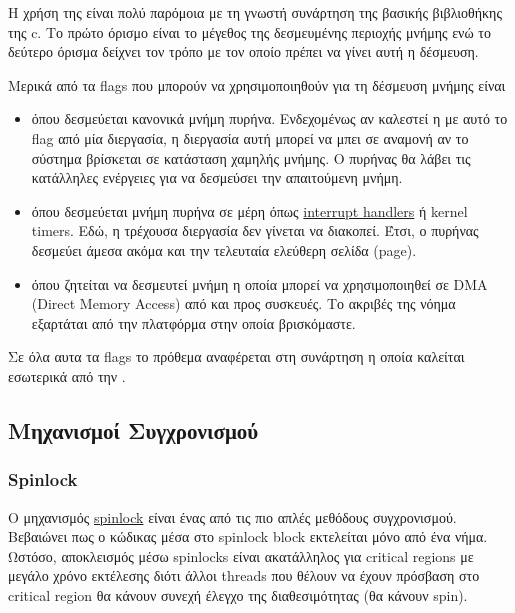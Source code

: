 \documentclass[18pt]{extarticle}
\begin{document}
\begin{file}
    
\end{file}

Η χρήση της είναι πολύ παρόμοια με τη γνωστή συνάρτηση  της βασικής βιβλιοθήκης της c.
Το πρώτο όρισμο είναι το μέγεθος της δεσμευμένης περιοχής μνήμης ενώ το δεύτερο όρισμα δείχνει τον τρόπο με τον οποίο πρέπει να γίνει αυτή η δέσμευση.

Μερικά από τα flags που μπορούν να χρησιμοποιηθούν για τη δέσμευση μνήμης είναι

\begin{itemize}
    \item {} όπου δεσμεύεται κανονικά μνήμη πυρήνα. Ενδεχομένως αν καλεστεί η  με αυτό το flag
        από μία διεργασία, η διεργασία αυτή μπορεί να μπει σε αναμονή αν το σύστημα βρίσκεται σε κατάσταση χαμηλής μνήμης.
        Ο πυρήνας θα λάβει τις κατάλληλες ενέργειες για να δεσμεύσει την απαιτούμενη μνήμη. 
    \item {} όπου δεσμεύεται μνήμη πυρήνα σε μέρη όπως \href{https://en.wikipedia.org/wiki/Interrupt_handler}{interrupt handlers}
            ή kernel timers. Εδώ, η τρέχουσα διεργασία δεν γίνεται να διακοπεί.
            Έτσι, ο πυρήνας δεσμεύει άμεσα ακόμα και την τελευταία ελεύθερη σελίδα (page).
    \item {} όπου ζητείται να δεσμευτεί μνήμη η οποία μπορεί να χρησιμοποιηθεί σε DMA (Direct Memory Access)
            από και προς συσκευές. Το ακριβές της νόημα εξαρτάται από την πλατφόρμα στην οποία βρισκόμαστε.
\end{itemize}

Σε όλα αυτα τα flags το πρόθεμα  αναφέρεται στη συνάρτηση  
η οποία καλείται εσωτερικά από την .

\subsection{Μηχανισμοί Συγχρονισμού}

\subsubsection{Spinlock}

Ο μηχανισμός \href{https://en.wikipedia.org/wiki/Spinlock}{spinlock} είναι ένας από τις πιο απλές μεθόδους συγχρονισμού. 
Βεβαιώνει πως ο κώδικας μέσα στο spinlock block εκτελείται μόνο από ένα νήμα.
Ωστόσο, αποκλεισμός μέσω spinlocks είναι ακατάλληλος για critical regions με μεγάλο χρόνο εκτέλεσης
διότι άλλοι threads που θέλουν να έχουν πρόσβαση στο critical region θα κάνουν συνεχή έλεγχο της διαθεσιμότητας (θα κάνουν spin).
\end{document}
